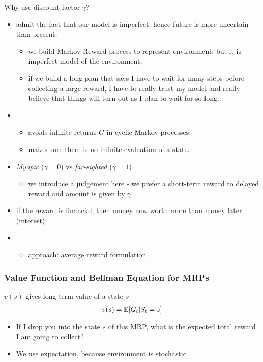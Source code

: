 \begin{notebox}
Why use discount factor $\gamma$?
\begin{itemize}
	\item admit the fact that our model is imperfect, hence future is more uncertain than present;
	\begin{itemize}
		\item we build Markov Reward process to represent environment, but it is imperfect model of the environment;
		\item if we build a long plan that says I have to wait for many steps before collecting a large reward, I have to really trust my model and really believe that things will turn out as I plan to wait for so long...
	\end{itemize} 
	\item {}
	\begin{itemize}
		\item avoids infinite returns $G$ in cyclic Markov processes;
		\item makes sure there is no infinite evaluation of a state.
	\end{itemize}
	\item \textit{Myopic} ($\gamma=0$) vs \textit{far-sighted} ($\gamma=1$)
	\begin{itemize}
		\item we introduce a judgement here - we prefer a short-term reward to delayed reward and amount is given by $\gamma$.
	\end{itemize}
	\item if the reward is financial, then money now worth more than money later (interest);
	\item {}
	\begin{itemize}
		\item approach: average reward formulation
	\end{itemize}
\end{itemize}
\end{notebox}

\subsubsection{Value Function and Bellman Equation for MRPs}

 $v(s)$ gives long-term value of a state $s$
\begin{align}
	v(s) = \operatorname{\mathbb{E}}[G_t | S_t = s]
\end{align}
\begin{itemize}
	\item If I drop you into the state $s$ of this MRP, what is the expected total reward I am going to collect?
	\item We use expectation, because environment is stochastic.
\end{itemize}

